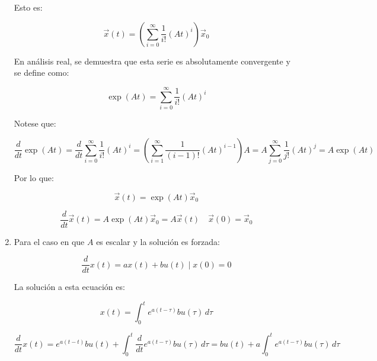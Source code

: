 \begin{enumerate}
        Esto es:

        \begin{equation}
            \vec{x}(t) = \left( \sum\limits_{i = 0}^{\infty} \frac{1}{i!} (A t)^i \right) \vec{x}_0 \nonumber
        \end{equation}

        En análisis real, se demuestra que esta serie es absolutamente convergente y se define como:

        \begin{equation}
            \exp{(At)} = \sum\limits_{i = 0}^{\infty} \frac{1}{i!} (A t)^i
        \end{equation}

        Notese que:

        \begin{equation*}
            \frac{d}{dt} \exp{(At)} = \frac{d}{dt} \sum\limits_{i=0}^{\infty} \frac{1}{i!} (At)^i = \left( \sum\limits_{i=1}^{\infty} \frac{1}{(i-1)!} (At)^{i-1} \right) A = A \sum\limits_{j=0}^{\infty} \frac{1}{j!} (At)^j = A \exp{(At)}
        \end{equation*}

        Por lo que:

        \begin{equation*}
            \vec{x}(t) = \exp{(At)} \vec{x}_0
        \end{equation*}

        \begin{equation*}
            \frac{d}{dt} \vec{x}(t) = A \exp{(At)} \vec{x}_0 = A \vec{x}(t) \quad \vec{x}(0) = \vec{x}_0
        \end{equation*}

    \item Para el caso en que $A$ es escalar y la solución es forzada:

        \begin{equation}
            \frac{d}{dt} x(t) = a x(t) + b u(t) \mid x(0) = 0
        \end{equation}

        La solución a esta ecuación es:

        \begin{equation}
            x(t) = \int_0^t e^{a(t-\tau)} b u(\tau) \, d \tau
        \end{equation}

        \begin{equation*}
            \frac{d}{dt} x(t) = e^{a(t-t)} b u(t) + \int_0^t \frac{d}{dt} e^{a(t-\tau)} b u(\tau) \, d \tau = b u(t) + a \int_0^t e^{a(t-\tau)} b u(\tau) \, d \tau
        \end{equation*}


\end{enumerate}
